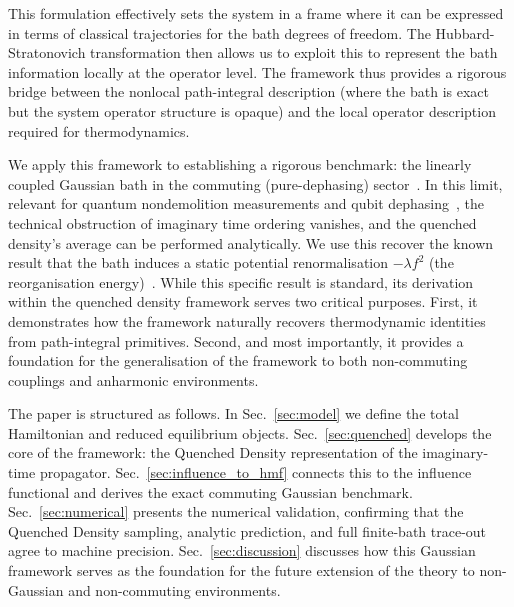 This formulation effectively sets the system in a frame where it can be expressed in terms of classical trajectories for the bath degrees of freedom. The Hubbard-Stratonovich transformation then allows us to exploit this to represent the bath information locally at the operator level. The framework thus provides a rigorous bridge between the nonlocal path-integral description (where the bath is exact but the system operator structure is opaque) and the local operator description required for thermodynamics.

We apply this framework to establishing a rigorous benchmark: the linearly coupled Gaussian bath in the commuting (pure-dephasing) sector~\cite{clerkIntroductionQuantumNoise2010,breuerTheoryOpenQuantum2002}. In this limit, relevant for quantum nondemolition measurements and qubit dephasing~\cite{makhlinQuantumStateEngineering2001,palmaQuantumComputersDissipation1996}, the technical obstruction of imaginary time ordering vanishes, and the quenched density's average can be performed analytically. We use this recover the known result that the bath induces a static potential renormalisation $-\lambda f^2$ (the reorganisation energy)~\cite{campisiTalknerHanggi2009Solvable}. While this specific result is standard, its derivation within the quenched density framework serves two critical purposes. First, it demonstrates how the framework naturally recovers thermodynamic identities from path-integral primitives. Second, and most importantly, it provides a foundation for the generalisation of the framework to both non-commuting couplings and anharmonic environments.

The paper is structured as follows. In Sec.~\ref{sec:model} we define the total Hamiltonian and reduced equilibrium objects. Sec.~\ref{sec:quenched} develops the core of the framework: the Quenched Density representation of the imaginary-time propagator. Sec.~\ref{sec:influence_to_hmf} connects this to the influence functional and derives the exact commuting Gaussian benchmark. Sec.~\ref{sec:numerical} presents the numerical validation, confirming that the Quenched Density sampling, analytic prediction, and full finite-bath trace-out agree to machine precision. Sec.~\ref{sec:discussion} discusses how this Gaussian framework serves as the foundation for the future extension of the theory to non-Gaussian and non-commuting environments.
